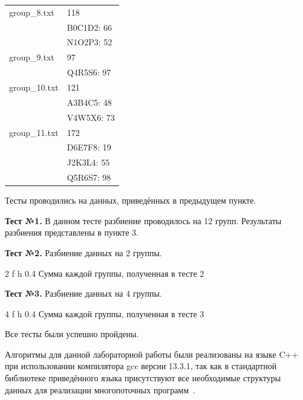 \begin{table}[H]
\begin{tabular}{|l|l|}
		group\_8.txt & 118 \\
		& B0C1D2: 66 \\
		& N1O2P3: 52 \\\hline
		
		
		group\_9.txt & 97 \\
		& Q4R5S6: 97 \\\hline
		
		group\_10.txt & 121 \\
		& A3B4C5: 48 \\
		& V4W5X6: 73 \\\hline
		
		
		group\_11.txt & 172 \\
		& D6E7F8: 19 \\
		& J2K3L4: 55 \\
		& Q5R6S7: 98 \\\hline
	\end{tabular}
\end{table}


\newpage
{}

Тесты проводились на данных, приведённых в предыдущем пункте.

\textbf{Тест №1.} В данном тесте разбиение проводилось на 12 групп. Результаты
разбиения представлены в пункте 3.

\textbf{Тест №2.} Разбиение данных на 2 группы.

\FloatBarrier
{}
{2} %
{f} %
{h} %
{0.4\textwidth} %
{Сумма каждой группы, полученная в тесте 2} %
\FloatBarrier

\textbf{Тест №3.} Разбиение данных на 4 группы.

\FloatBarrier
{}
{4} %
{f} %
{h} %
{0.4\textwidth} %
{Сумма каждой группы, полученная в тесте 3} %
\FloatBarrier

Все тесты были успешно пройдены.

Алгоритмы для данной лабораторной работы были реализованы на языке C++ при использовании компилятора gcc версии 13.3.1, так как в стандартной библиотеке приведённого языка присутствуют все необходимые структуры данных для реализации многопоточных программ~\cite{iso14882}.

